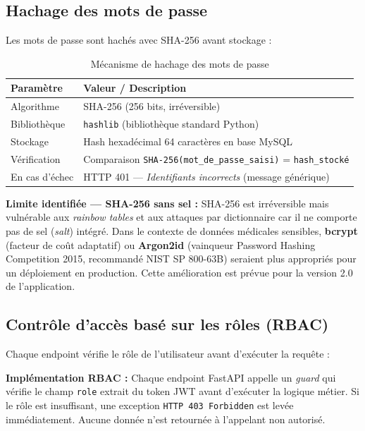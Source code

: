\documentclass[12pt,a4paper]{report}
\begin{document}
	\subsection{Hachage des mots de passe}
	
	Les mots de passe sont hachés avec SHA-256 avant stockage :
	
	\begin{table}[H]
		\centering
		\caption{Mécanisme de hachage des mots de passe}
		\renewcommand{\arraystretch}{1.3}
		\begin{tabularx}{\textwidth}{lX}
			\toprule
			\textbf{Paramètre} & \textbf{Valeur / Description} \\
			\midrule
			Algorithme           & SHA-256 (256 bits, irréversible) \\
			Bibliothèque         & \texttt{hashlib} (bibliothèque standard Python) \\
			Stockage             & Hash hexadécimal 64 caractères en base MySQL \\
			Vérification         & Comparaison \texttt{SHA-256(mot\_de\_passe\_saisi)} = \texttt{hash\_stocké} \\
			En cas d'échec       & HTTP 401 — \textit{Identifiants incorrects} (message générique) \\
			\bottomrule
		\end{tabularx}
	\end{table}
	\begin{infobox}
		\textbf{Limite identifiée — SHA-256 sans sel :} SHA-256 est irréversible mais
		vulnérable aux \textit{rainbow tables} et aux attaques par dictionnaire car il
		ne comporte pas de sel (\textit{salt}) intégré. Dans le contexte de données médicales
		sensibles, \textbf{bcrypt} (facteur de coût adaptatif) ou \textbf{Argon2id}
		(vainqueur Password Hashing Competition 2015, recommandé NIST SP 800-63B) seraient
		plus appropriés pour un déploiement en production. Cette amélioration est prévue
		pour la version 2.0 de l'application.
	\end{infobox}
	
	\subsection{Contrôle d'accès basé sur les rôles (RBAC)}
	
	Chaque endpoint vérifie le rôle de l'utilisateur avant d'exécuter la requête :
	
	\begin{infobox}
		\textbf{Implémentation RBAC :} Chaque endpoint FastAPI appelle un \textit{guard}
		qui vérifie le champ \texttt{role} extrait du token JWT avant d'exécuter la logique
		métier. Si le rôle est insuffisant, une exception \texttt{HTTP 403 Forbidden} est
		levée immédiatement. Aucune donnée n'est retournée à l'appelant non autorisé.
	\end{infobox}
	
\end{document}
